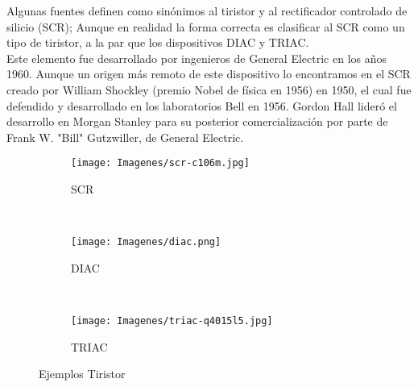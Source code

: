 \documentclass{article}
\begin{document}
Algunas fuentes definen como sinónimos al tiristor y al rectificador controlado de silicio (SCR); Aunque en realidad la forma correcta es clasificar al SCR como un tipo de tiristor, a la par que los dispositivos DIAC y TRIAC.\citep{Tirs}\\

Este elemento fue desarrollado por ingenieros de General Electric en los años 1960. Aunque un origen más remoto de este dispositivo lo encontramos en el SCR creado por William Shockley (premio Nobel de física en 1956) en 1950, el cual fue defendido y desarrollado en los laboratorios Bell en 1956. Gordon Hall lideró el desarrollo en Morgan Stanley para su posterior comercialización por parte de Frank W. "Bill" Gutzwiller, de General Electric.\citep{Tirs}\\




\begin{figure}[h!]
    \centering
    \begin{subfigure}[b]{0.3\textwidth}
        \texttt{[image: Imagenes/scr-c106m.jpg]}
        \caption{SCR}
        \label{fig:scr}
    \end{subfigure}
    ~ %
    \begin{subfigure}[b]{0.3\textwidth}
        \texttt{[image: Imagenes/diac.png]}
        \caption{DIAC}
        \label{fig:diac}
    \end{subfigure}
    ~ %
    \begin{subfigure}[b]{0.3\textwidth}
        \texttt{[image: Imagenes/triac-q4015l5.jpg]}
        \caption{TRIAC}
        \label{fig:triac}
    \end{subfigure}
    \caption{Ejemplos Tiristor}\label{fig:animals}
\end{figure}




\end{document}

